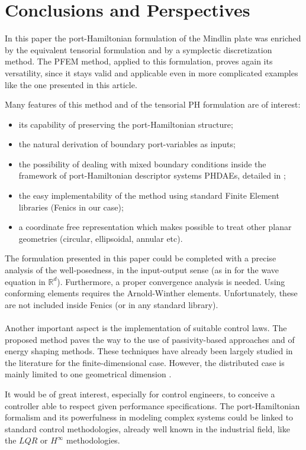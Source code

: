 \documentclass[preprint,12pt]{elsarticle}
\newcommand{\secondReviewer}[1]{\textcolor{blue!80!black}{#1}}
\begin{document}
\section*{Conclusions and Perspectives}

In this paper the port-Hamiltonian formulation of the Mindlin plate was enriched by the equivalent tensorial formulation and by a symplectic discretization method. The PFEM method, applied to this formulation, proves again its versatility, since it stays valid and applicable even in more complicated examples like the one presented in this article. \secondReviewer{Many features of this method and of the tensorial PH formulation are of interest:
\begin{itemize}
	\item its capability of preserving the port-Hamiltonian structure;
	\item the natural derivation of boundary port-variables as inputs;
	\item the possibility of dealing with mixed boundary conditions inside the framework of  port-Hamiltonian descriptor systems PHDAEs,  detailed in \cite{beattie2018linear};
	\item the easy implementability of the method using standard Finite Element libraries (Fenics \cite{LoggMardalEtAl2012} in our case);
	\item a coordinate free representation which makes possible to treat other planar geometries (circular, ellipsoidal, annular etc).
\end{itemize}  
The formulation presented in this paper could be completed with a precise analysis of the well-posedness, in the input-output sense (as in \cite{waveEqZwart} for the wave equation in $\mathbb{R}^d$). Furthermore, a proper convergence analysis is needed. Using conforming elements requires the Arnold-Winther elements. Unfortunately, these are not included inside Fenics (or in any standard library).  \\ \\
Another important aspect is the implementation of suitable control laws. The proposed method paves the way to the use of passivity-based approaches and of energy shaping methods. These techniques have already been largely studied in the literature \cite{Ortega2002, OrtegaContrInt} for the finite-dimensional case. However, the distributed case is mainly limited to one geometrical dimension \cite{MaccContrDist}.}  It would be of great interest, especially for control engineers, to conceive a controller able to respect given performance specifications. The port-Hamiltonian formalism and its powerfulness in modeling complex systems could be linked to standard control methodologies, already well known in the industrial field, like the $LQR$ or $H^\infty$ methodologies.   
\end{document}
